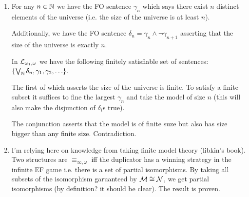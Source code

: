 \begin{enumerate}[1.]
\begin{enumerate}[a)]
  \end{enumerate}

\addtocounter{enumi}{2}

\item For any \(n \in \mathbb{N}\) we have the FO sentence \(\gamma_n\) which says there exist \(n\) distinct elements of the universe (i.e. the size of the universe is at least \(n\)). 

Additionally, we have the FO sentence \(\delta_n = \gamma_n \land \neg \gamma_{n+1}\) asserting that the size of the universe is exactly \(n\). 

In \(\mathcal{L}_{\omega_1, \omega}\) we have the following finitely satisfiable set of sentences: \(\{\bigvee_{\mathbb{N}} \delta_n, \gamma_1, \gamma_2, \ldots\}\).

The first of which asserts the size of the universe is finite. To satisfy a finite subset it suffices to fine the largest \(\gamma_n\) and take the model of size \(n\) (this will also make the disjunction of \(\delta_i\)s true). 

The conjunction asserts that the model is of finite suze but also has size bigger than any finite size. Contradiction.    
 
\item I'm relying here on knowledge from taking finite model theory (libkin's book). Two structures are \(\equiv_{\infty, \omega}\) iff the duplicator has a winning strategy in the infinite EF game i.e. there is a set of partial isomorphisms. By taking all subsets of the isomorphism garuanteed by \(\mathcal{M} \cong \mathcal{N}\), we get partial isomorphisms (by definition? it should be clear). The result is proven.
 
\end{enumerate}
